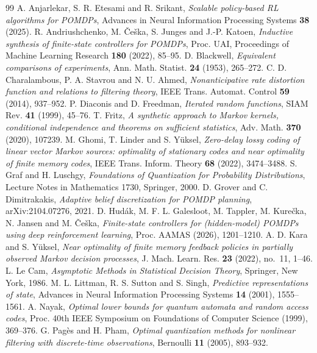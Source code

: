 \begin{thebibliography}{99}
 A. Anjarlekar, S. R. Etesami and R. Srikant, \emph{Scalable policy-based RL algorithms for POMDPs}, Advances in Neural Information Processing Systems \textbf{38} (2025).
 R. Andriushchenko, M. \v{C}e\v{s}ka, S. Junges and J.-P. Katoen, \emph{Inductive synthesis of finite-state controllers for POMDPs}, Proc. UAI, Proceedings of Machine Learning Research \textbf{180} (2022), 85--95.
 D. Blackwell, \emph{Equivalent comparisons of experiments}, Ann. Math. Statist. \textbf{24} (1953), 265--272.
 C. D. Charalambous, P. A. Stavrou and N. U. Ahmed, \emph{Nonanticipative rate distortion function and relations to filtering theory}, IEEE Trans. Automat. Control \textbf{59} (2014), 937--952.
 P. Diaconis and D. Freedman, \emph{Iterated random functions}, SIAM Rev. \textbf{41} (1999), 45--76.
 T. Fritz, \emph{A synthetic approach to Markov kernels, conditional independence and theorems on sufficient statistics}, Adv. Math. \textbf{370} (2020), 107239.
 M. Ghomi, T. Linder and S. Y\"uksel, \emph{Zero-delay lossy coding of linear vector Markov sources: optimality of stationary codes and near optimality of finite memory codes}, IEEE Trans. Inform. Theory \textbf{68} (2022), 3474--3488.
 S. Graf and H. Luschgy, \emph{Foundations of Quantization for Probability Distributions}, Lecture Notes in Mathematics 1730, Springer, 2000.
 D. Grover and C. Dimitrakakis, \emph{Adaptive belief discretization for POMDP planning}, arXiv:2104.07276, 2021.
 D. Hud\'ak, M. F. L. Galesloot, M. Tappler, M. Kure\v{c}ka, N. Jansen and M. \v{C}e\v{s}ka, \emph{Finite-state controllers for (hidden-model) POMDPs using deep reinforcement learning}, Proc. AAMAS (2026), 1201--1210.
 A. D. Kara and S. Y\"uksel, \emph{Near optimality of finite memory feedback policies in partially observed Markov decision processes}, J. Mach. Learn. Res. \textbf{23} (2022), no.~11, 1--46.
 L. Le Cam, \emph{Asymptotic Methods in Statistical Decision Theory}, Springer, New York, 1986.
 M. L. Littman, R. S. Sutton and S. Singh, \emph{Predictive representations of state}, Advances in Neural Information Processing Systems \textbf{14} (2001), 1555--1561.
 A. Nayak, \emph{Optimal lower bounds for quantum automata and random access codes}, Proc. 40th IEEE Symposium on Foundations of Computer Science (1999), 369--376.
 G. Pag\`es and H. Pham, \emph{Optimal quantization methods for nonlinear filtering with discrete-time observations}, Bernoulli \textbf{11} (2005), 893--932.

\end{thebibliography}
